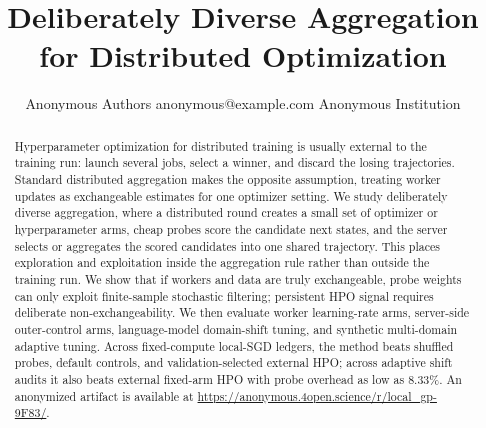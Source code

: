 \documentclass[10pt]{article}
\title{Deliberately Diverse Aggregation for Distributed Optimization}
\author{\name Anonymous Authors \email anonymous@example.com \addr Anonymous Institution}
\begin{document}
\maketitle

\begin{abstract}
Hyperparameter optimization for distributed training is usually external to
the training run: launch several jobs, select a winner, and discard the losing
trajectories. Standard distributed aggregation makes the opposite assumption,
treating worker updates as exchangeable estimates for one optimizer setting. We
study deliberately diverse aggregation, where a distributed round creates a
small set of optimizer or hyperparameter arms, cheap probes score the candidate
next states, and the server selects or aggregates the scored candidates into
one shared trajectory. This places exploration and exploitation inside the
aggregation rule rather than outside the training run. We show that if workers
and data are truly exchangeable, probe weights can only exploit finite-sample
stochastic filtering; persistent HPO signal requires deliberate
non-exchangeability. We then evaluate worker learning-rate arms, server-side
outer-control arms, language-model domain-shift tuning, and synthetic
multi-domain adaptive tuning. Across fixed-compute local-SGD ledgers, the
method beats shuffled probes, default controls, and validation-selected
external HPO; across adaptive shift audits it also beats external fixed-arm HPO
with probe overhead as low as 8.33\%. An anonymized artifact is available at
\url{https://anonymous.4open.science/r/local_gp-9F83/}.
\end{abstract}











\appendix

\end{document}
